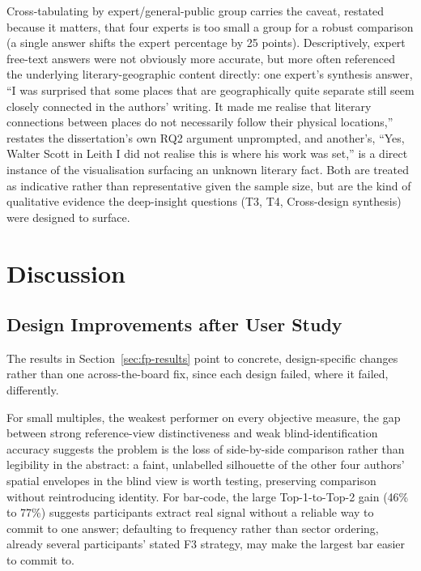 \documentclass[logo,msc]{infthesis}
\begin{document}
Cross-tabulating by expert/general-public group carries the caveat, restated because it matters, that four experts is too small a group for a robust comparison (a single answer shifts the expert percentage by 25 points). Descriptively, expert free-text answers were not obviously more accurate, but more often referenced the underlying literary-geographic content directly: one expert's synthesis answer, ``I was surprised that some places that are geographically quite separate still seem closely connected in the authors' writing. It made me realise that literary connections between places do not necessarily follow their physical locations,'' restates the dissertation's own RQ2 argument unprompted, and another's, ``Yes, Walter Scott in Leith I did not realise this is where his work was set,'' is a direct instance of the visualisation surfacing an unknown literary fact. Both are treated as indicative rather than representative given the sample size, but are the kind of qualitative evidence the deep-insight questions (T3, T4, Cross-design synthesis) were designed to surface.
 
 
\chapter{Discussion}
\label{chap:discussion}
 
\section{Design Improvements after User Study}

The results in Section~\ref{sec:fp-results} point to concrete, design-specific changes rather than one across-the-board fix, since each design failed, where it failed, differently.

For small multiples, the weakest performer on every objective measure, the gap between strong reference-view distinctiveness and weak blind-identification accuracy suggests the problem is the loss of side-by-side comparison rather than legibility in the abstract: a faint, unlabelled silhouette of the other four authors' spatial envelopes in the blind view is worth testing, preserving comparison without reintroducing identity. For bar-code, the large Top-1-to-Top-2 gain (46\% to 77\%) suggests participants extract real signal without a reliable way to commit to one answer; defaulting to frequency rather than sector ordering, already several participants' stated F3 strategy, may make the largest bar easier to commit to.
\end{document}
